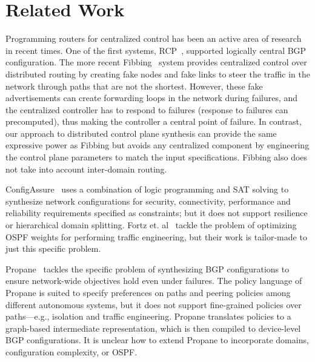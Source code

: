 \section{Related Work}\label{sec:related}
 Programming routers for centralized
control has been an active area of research in recent times. One of
the first systems, RCP~\cite{rcp}, supported logically central BGP
configuration. The more recent Fibbing~\cite{fibbing} system provides
centralized control over distributed routing by creating fake nodes
and fake links to steer the traffic in the network through paths that
are not the shortest. However, these fake advertisements can create
forwarding loops in the network during failures, and the centralized
controller has to respond to failures (response to failures can
precomputed), thus making the controller a central point of
failure. In contrast, our approach to distributed control plane
synthesis can provide the same expressive power as Fibbing but avoids
any centralized component by engineering the control plane parameters
to match the input specifications.  Fibbing also does not take into
account inter-domain routing.

 ConfigAssure~\cite{configassure}
uses a combination of logic programming and SAT solving to synthesize
network configurations for security, connectivity, performance and
reliability requirements specified as constraints; but it does not
support resilience or hierarchical domain splitting.  Fortz
et. al~\cite{ospf-te} tackle the problem of optimizing OSPF weights
for performing traffic engineering, but their work is tailor-made
to just this specific problem.

Propane~\cite{propane} tackles the specific problem of synthesizing
BGP configurations to ensure network-wide objectives hold even under
failures. The policy language of Propane is suited to specify
preferences on paths and peering policies among different autonomous
systems, but it does not support fine-grained policies over paths---e.g.,  isolation and traffic engineering. Propane translates policies
to a graph-based intermediate representation, which is then compiled
to device-level BGP configurations. It is unclear how to extend
Propane to incorporate domains, configuration complexity, or OSPF.

